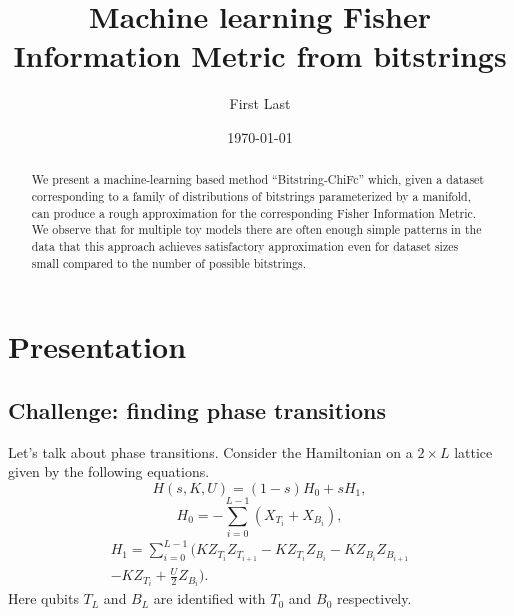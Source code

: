 \documentclass[
  american,aps,pra,reprint,floatfix,nofootinbib,superscriptaddress
]{revtex4-2}
\begin{document}
\title{Machine learning Fisher Information Metric from bitstrings}
\author{First Last}

\date{\today}

\begin{abstract}
We present a machine-learning based method ``Bitstring-ChiFc'' which,
given a dataset corresponding to a family of distributions of bitstrings
parameterized by a manifold, can produce a rough approximation
for the corresponding Fisher Information Metric.
We observe that for multiple toy models there are often enough simple patterns
in the data that this approach
achieves satisfactory approximation even for dataset sizes small
compared to the number of possible bitstrings.
\end{abstract}

\maketitle

\section{Presentation}
\subsection{Challenge: finding phase transitions}
Let's talk about phase transitions.  Consider the Hamiltonian
on a $2 \times L$ lattice given by the following equations.
\begin{equation}
  \label{eq:Hladder.1}
  H(s,K,U) = (1-s) H_0 + s H_1,
\end{equation}
\begin{equation}
  \label{eq:Hladder.2}
  H_0 = -\sum_{i=0}^{L-1} (X_{T_i} + X_{B_i}),
\end{equation}
\begin{multline}
  \label{eq:Hladder.3}
  H_1 = \sum_{i=0}^{L-1} \biggl(K Z_{T_i} Z_{T_{i+1}} - K Z_{T_i} Z_{B_i}
    - K Z_{B_i} Z_{B_{i+1}} \\
  - K Z_{T_i} + \frac{U}{2} Z_{B_i}\biggr).
\end{multline}
Here qubits $T_L$ and $B_L$ are identified with $T_0$ and $B_0$ respectively.
\end{document}
